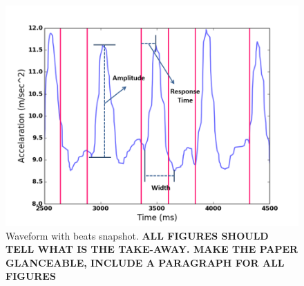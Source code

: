 \begin{figure}
\includegraphics[width=\columnwidth]{figure/waveform_resp.png}
\centering
\caption{\label{fig:waveform}Waveform with beats snapshot. \textbf{ALL FIGURES SHOULD TELL WHAT IS THE TAKE-AWAY. MAKE THE PAPER GLANCEABLE, INCLUDE A PARAGRAPH FOR ALL FIGURES}}
\end{figure}


